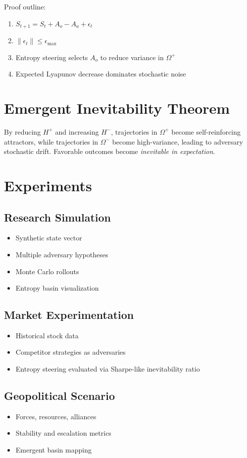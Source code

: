 \documentclass[12pt]{article}
\begin{document}
Proof outline:
\begin{enumerate}
    \item $S_{t+1} = S_t + A_o - A_a + \epsilon_t$
    \item $\| \epsilon_t \| \le \epsilon_{\max}$
    \item Entropy steering selects $A_o$ to reduce variance in $\Omega^+$
    \item Expected Lyapunov decrease dominates stochastic noise
\end{enumerate}

\section{Emergent Inevitability Theorem}
By reducing $H^+$ and increasing $H^-$, trajectories in $\Omega^+$ become self-reinforcing attractors, while trajectories in $\Omega^-$ become high-variance, leading to adversary stochastic drift. Favorable outcomes become \textit{inevitable in expectation}.

\section{Experiments}
\subsection{Research Simulation}
\begin{itemize}
    \item Synthetic state vector
    \item Multiple adversary hypotheses
    \item Monte Carlo rollouts
    \item Entropy basin visualization
\end{itemize}

\subsection{Market Experimentation}
\begin{itemize}
    \item Historical stock data
    \item Competitor strategies as adversaries
    \item Entropy steering evaluated via Sharpe-like inevitability ratio
\end{itemize}

\subsection{Geopolitical Scenario}
\begin{itemize}
    \item Forces, resources, alliances
    \item Stability and escalation metrics
    \item Emergent basin mapping
\end{itemize}
\end{document}
